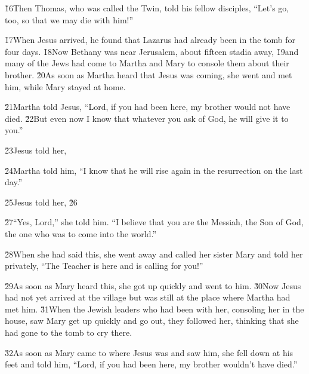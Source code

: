 \v{16}Then Thomas, who was called the Twin, told his fellow disciples, ``Let's go, too, so that we may die with him!''

\v{17}When Jesus arrived, he found that Lazarus had already been in the tomb for four days. \v{18}Now Bethany was near Jerusalem, about fifteen stadia away, \v{19}and many of the Jews had come to Martha and Mary to console them about their brother. \v{20}As soon as Martha heard that Jesus was coming, she went and met him, while Mary stayed at home.

\v{21}Martha told Jesus, ``Lord, if you had been here, my brother would not have died. \v{22}But even now I know that whatever you ask of God, he will give it to you.''

\v{23}Jesus told her, 

\v{24}Martha told him, ``I know that he will rise again in the resurrection on the last day.''

\v{25}Jesus told her,  \v{26}

\v{27}``Yes, Lord,'' she told him. ``I believe that you are the Messiah, the Son of God, the one who was to come into the world.''

\v{28}When she had said this, she went away and called her sister Mary and told her privately, ``The Teacher is here and is calling for you!''

\v{29}As soon as Mary heard this, she got up quickly and went to him. \v{30}Now Jesus had not yet arrived at the village but was still at the place where Martha had met him. \v{31}When the Jewish leaders who had been with her, consoling her in the house, saw Mary get up quickly and go out, they followed her, thinking that she had gone to the tomb to cry there.

\v{32}As soon as Mary came to where Jesus was and saw him, she fell down at his feet and told him, ``Lord, if you had been here, my brother wouldn't have died.''

